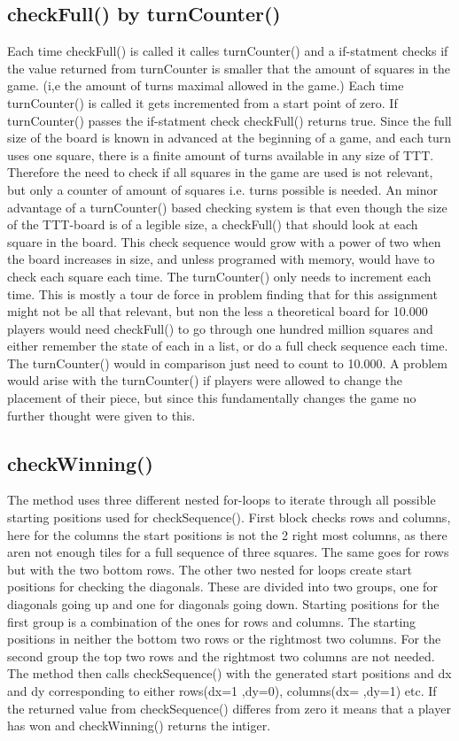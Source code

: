 \documentclass[a4paper,10pt]{article}
\begin{document}
\subsection{checkFull() by turnCounter()}
Each time checkFull() is called it calles turnCounter() and a if-statment checks if the value returned from turnCounter is smaller that the amount of squares in the game. (i,e the amount of turns maximal allowed in the game.) Each time turnCounter() is called it gets incremented from a start point of zero. If turnCounter() passes the if-statment check checkFull() returns true. 
Since the full size of the board is known in advanced at the beginning of a game, and each turn uses one square,  there is a finite amount of turns available in any size of TTT. Therefore the need to check if all squares in the game are used is not relevant, but only a counter of amount of squares i.e. turns possible is needed. 
An minor advantage of a turnCounter() based checking system is that even though the size of the TTT-board is of a legible size, a checkFull() that should look at each square in the board. This check sequence would grow with a power of two when the board increases in size, and unless programed with memory, would have to check each square each time. The turnCounter() only needs to increment each time. 
This is mostly a tour de force in problem finding that for this assignment might not be all that relevant, but non the less a theoretical board for 10.000 players would need checkFull() to go through one hundred million squares and either remember the state of each in a list, or do a full check sequence each time. The turnCounter() would in comparison just need to count to 10.000.
A problem would arise with the turnCounter() if players were allowed to change the placement of their piece, but since this fundamentally changes the game no further thought were given to this.

\subsection{checkWinning()} 
The method uses three different nested for-loops to iterate through all possible starting positions used for checkSequence(). First block checks rows and columns, here for the columns the start positions is not the 2 right most columns, as there aren not enough tiles for a full sequence of three squares. The same goes for rows but  with the two bottom  rows. 
The other two nested for loops create start positions for checking the diagonals. These are divided into two groups, one for diagonals going up and  one for diagonals going down. Starting positions for the first group is a combination of the ones for rows and columns. The starting positions in neither the bottom two rows or the rightmost two columns. For the second group the top two rows and the rightmost two columns are not needed.
The method then calls checkSequence() with the generated start positions and dx and dy corresponding to either rows(dx=1 ,dy=0), columns(dx= ,dy=1) etc.
If the returned value from checkSequence() differes from zero it means that a player has won and checkWinning() returns the intiger.
\end{document}
